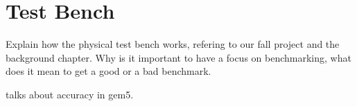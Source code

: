 \section{Test Bench}
Explain how the physical test bench works, refering to our fall project and the
background chapter. Why is it important to have a focus on benchmarking, what
does it mean to get a good or a bad benchmark.

\cite{butko2012accuracy,pusdesrissources} talks about accuracy in gem5.

